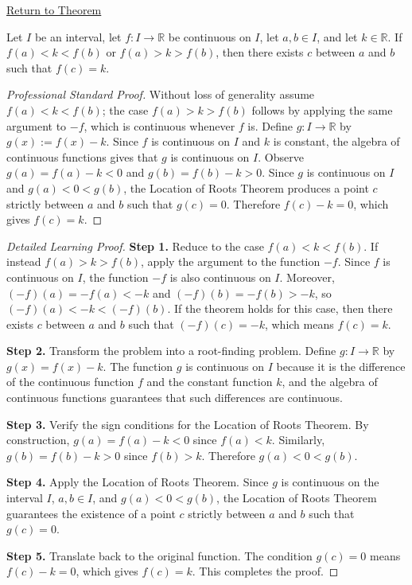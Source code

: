\newpage
{}
\label{prf:bolzano-intermediate-value}

\begin{remark*}[Return]
\hyperref[thm:bolzano-intermediate-value]{Return to Theorem}
\end{remark*}

\begin{theorem*}
Let $I$ be an interval, let $f : I \to \mathbb{R}$ be continuous on $I$, let $a, b \in I$, and let $k \in \mathbb{R}$. If $f(a) < k < f(b)$ or $f(a) > k > f(b)$, then there exists $c$ between $a$ and $b$ such that $f(c) = k$.
\end{theorem*}

\begin{proof}[Professional Standard Proof]
\LRAProofBodyStart
Without loss of generality assume $f(a) < k < f(b)$; the case $f(a) > k > f(b)$ follows by applying the same argument to $-f$, which is continuous whenever $f$ is. Define $g : I \to \mathbb{R}$ by $g(x) := f(x) - k$. Since $f$ is continuous on $I$ and $k$ is constant, the algebra of continuous functions gives that $g$ is continuous on $I$. Observe $g(a) = f(a) - k < 0$ and $g(b) = f(b) - k > 0$. Since $g$ is continuous on $I$ and $g(a) < 0 < g(b)$, the Location of Roots Theorem produces a point $c$ strictly between $a$ and $b$ such that $g(c) = 0$. Therefore $f(c) - k = 0$, which gives $f(c) = k$.
\end{proof}

\begin{proof}[Detailed Learning Proof]
\LRAProofBodyStart

\textbf{Step 1.} Reduce to the case $f(a) < k < f(b)$. If instead $f(a) > k > f(b)$, apply the argument to the function $-f$. Since $f$ is continuous on $I$, the function $-f$ is also continuous on $I$. Moreover, $(-f)(a) = -f(a) < -k$ and $(-f)(b) = -f(b) > -k$, so $(-f)(a) < -k < (-f)(b)$. If the theorem holds for this case, then there exists $c$ between $a$ and $b$ such that $(-f)(c) = -k$, which means $f(c) = k$.

\textbf{Step 2.} Transform the problem into a root-finding problem. Define $g : I \to \mathbb{R}$ by $g(x) = f(x) - k$. The function $g$ is continuous on $I$ because it is the difference of the continuous function $f$ and the constant function $k$, and the algebra of continuous functions guarantees that such differences are continuous.

\textbf{Step 3.} Verify the sign conditions for the Location of Roots Theorem. By construction, $g(a) = f(a) - k < 0$ since $f(a) < k$. Similarly, $g(b) = f(b) - k > 0$ since $f(b) > k$. Therefore $g(a) < 0 < g(b)$.

\textbf{Step 4.} Apply the Location of Roots Theorem. Since $g$ is continuous on the interval $I$, $a, b \in I$, and $g(a) < 0 < g(b)$, the Location of Roots Theorem guarantees the existence of a point $c$ strictly between $a$ and $b$ such that $g(c) = 0$.

\textbf{Step 5.} Translate back to the original function. The condition $g(c) = 0$ means $f(c) - k = 0$, which gives $f(c) = k$. This completes the proof.
\end{proof}

